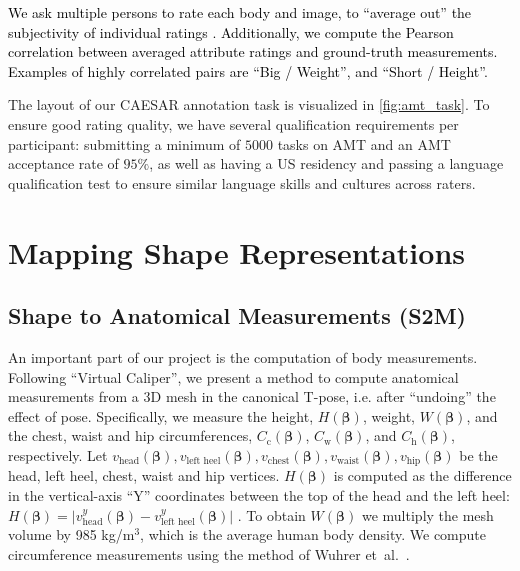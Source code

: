 \documentclass[10pt,twocolumn,letterpaper]{article}
\newcommand{\vcaliper}{``Virtual Caliper''\xspace}
\newcommand{\virtualcaliper}{\vcaliper}
\newcommand{\tpose}{\mbox{T-pose}\xspace}
\newcommand{\threeD}{3D\xspace}
\newcommand{\amt}{\mbox{AMT}\xspace}
\newcommand{\caesar}{\mbox{CAESAR}\xspace}
\newcommand{\shape}{\bm{\beta}}
\renewcommand{\etal}{\mbox{et al.}\xspace}
\renewcommand{\ie}{\mbox{i.e.}\xspace}
\newcommand{\height}{H}
\newcommand{\weight}{W}
\newcommand{\heightArg}{\height(\shape)}
\newcommand{\weightArg}{\weight(\shape)}
\newcommand{\chestCirc}{C_{\text{c}}}
\newcommand{\waistCirc}{C_{\text{w}}}
\newcommand{\hipsCirc}{C_{\text{h}}}
\newcommand{\chestCircArg}{\chestCirc(\shape)}
\newcommand{\waistCircArg}{\waistCirc(\shape)}
\newcommand{\hipsCircArg}{\hipsCirc(\shape)}
\newcommand{\cameraready}[1]{\textcolor{Fuchsia}{{#1}}\xspace}
\renewcommand{\cameraready}[1]{\textcolor{black}{{#1}}\xspace}
\begin{document}
\begin{appendices}
\cameraready{We ask multiple persons to rate each body and image, to “average out” the subjectivity of individual ratings \cite{Streuber:SIGGRAPH:2016}. Additionally, we compute the Pearson correlation between averaged attribute ratings and ground-truth measurements. Examples of highly correlated pairs are “Big / Weight”, and “Short / Height”.}

The layout of our \caesar annotation task is visualized in \cref{fig:amt_task}. 
To ensure good rating quality, we have several qualification requirements per participant: 
submitting a minimum of $5000$ tasks on \amt and an \amt acceptance rate of $95\%$, as well as having a US residency and passing a language qualification test to ensure similar language skills and cultures across raters.


\begin{figure*}[t]
    \centering
    \caption{Layout of the \amt task for a male subject.
        \textbf{Left:}      the \threeD body mesh in A-pose.
        \textbf{Right:}     the attributes and ratings buttons.
    }
    \label{fig:amt_task}
\end{figure*}
  
\section{Mapping Shape Representations}
\subsection{Shape to Anatomical Measurements (S2M)}
\label{supmat:sec:virtual_measurements}

\newcommand{\headvert}[0]{v_{\text{head}}}
\newcommand{\heelvertex}[0]{v_{\text{left heel}}}
\newcommand{\chestvertex}[0]{v_{\text{chest}}}
\newcommand{\waistvertex}[0]{v_{\text{waist}}}
\newcommand{\hipvertex}[0]{v_{\text{hip}}}

An important part of our project is the
computation of body measurements.
Following \virtualcaliper \cite{pujades2019virtual}, we present a method to compute anatomical measurements from a \threeD mesh in the canonical \tpose, \ie after ``undoing'' the effect of pose.
Specifically, we measure the height, $\heightArg$, weight, $\weightArg$, and the chest, waist and hip circumferences, $\chestCircArg$, $\waistCircArg$, and $\hipsCircArg$, respectively.
Let
$\headvert(\shape), \heelvertex(\shape), \chestvertex(\shape), \waistvertex(\shape), \hipvertex(\shape)$
be the
head,
left heel,
chest,
waist and
hip
vertices.
$\heightArg$ is computed as the difference in the vertical-axis ``Y'' coordinates between
the top of the head and the left heel:
$\heightArg = \lvert \headvert^y(\shape) - \heelvertex^y(\shape)\rvert$ .
To obtain $W(\shape)$ we multiply the mesh volume by 985 kg/m$^3$, which is the average human body density.
We compute circumference measurements using the method of
Wuhrer \etal~\cite{wuhrer2013estimating}.


\end{appendices}
\end{document}
